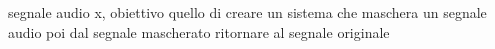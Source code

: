 segnale audio x, obiettivo quello di creare un sistema che maschera un segnale audio
poi dal segnale mascherato ritornare al segnale originale
